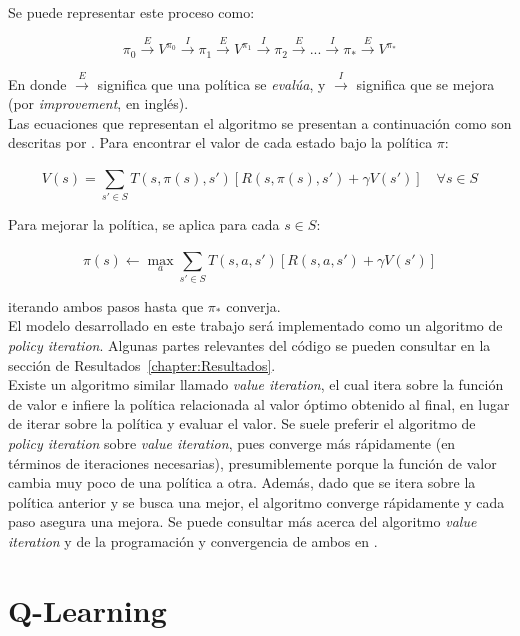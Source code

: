 Se puede representar este proceso como:

$$
\pi_0 \overset{E}{\rightarrow} V^{\pi_{0}} \overset{I}{\rightarrow}
\pi_1 \overset{E}{\rightarrow} V^{\pi_{1}} \overset{I}{\rightarrow}
\pi_2 \overset{E}{\rightarrow} 
...
\overset{I}{\rightarrow} \pi_{*} \overset{E}{\rightarrow} V^{\pi_{*}}
$$

En donde $\overset{E}{\rightarrow}$ significa que una pol\'itica se \textit{eval\'ua}, y $\overset{I}{\rightarrow}$ significa que se mejora (por \textit{improvement}, en ingl\'es). \\

Las ecuaciones que representan el algoritmo se presentan a continuaci\'on como son descritas por \citet{Frazzoli}. Para encontrar el valor de cada estado bajo la pol\'itica $\pi$:

$$
V(s) = \sum_{s' \in S}^{ } T(s, \pi(s), s')[R(s, \pi(s), s') + \gamma V(s')] \quad \forall s \in S
$$

Para mejorar la pol\'itica, se aplica para cada $s \in S$:

$$
\pi(s) \leftarrow \max_a \sum_{s' \in S}^{ }T(s,a,s')[R(s,a,s') + \gamma V(s')]
$$

iterando ambos pasos hasta que $\pi_*$ converja.\\

El modelo desarrollado en este trabajo ser\'a implementado como un algoritmo de \textit{policy iteration}. Algunas partes relevantes del c\'odigo se pueden consultar en la secci\'on de Resultados~\ref{chapter:Resultados}.\\

Existe un algoritmo similar llamado \textit{value iteration}, el cual itera sobre la funci\'on de valor e infiere la pol\'itica relacionada al valor \'optimo obtenido al final, en lugar de iterar sobre la pol\'itica y evaluar el valor. Se suele preferir el algoritmo de \textit{policy iteration} sobre \textit{value iteration}, pues converge m\'as r\'apidamente (en t\'erminos de iteraciones necesarias), presumiblemente porque la funci\'on de valor cambia muy poco de una pol\'itica a otra. Adem\'as, dado que se itera sobre la pol\'itica anterior y se busca una mejor, el algoritmo converge r\'apidamente y cada paso asegura una mejora. Se puede consultar m\'as acerca del algoritmo \textit{value iteration} y de la programaci\'on y convergencia de ambos en \citet{Sutton}.

\section{Q-Learning}

